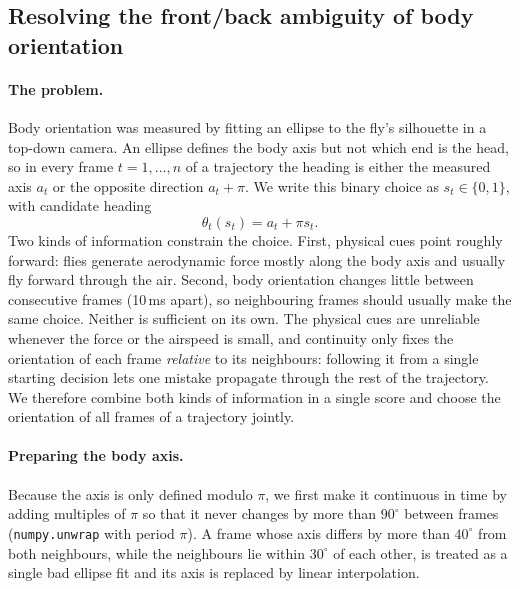 
\subsection*{Resolving the front/back ambiguity of body orientation}

\paragraph{The problem.}
Body orientation was measured by fitting an ellipse to the fly's silhouette in a top-down camera. An ellipse
defines the body axis but not which end is the head, so in every frame $t = 1,\dots,n$ of a trajectory the
heading is either the measured axis $a_t$ or the opposite direction $a_t + \pi$. We write this binary choice as
$s_t \in \{0, 1\}$, with candidate heading
\begin{equation}
  \theta_t(s_t) = a_t + \pi s_t .
\end{equation}
Two kinds of information constrain the choice. First, physical cues point roughly forward: flies generate
aerodynamic force mostly along the body axis and usually fly forward through the air. Second, body orientation
changes little between consecutive frames (10\,ms apart), so neighbouring frames should usually make the same
choice. Neither is sufficient on its own. The physical cues are unreliable whenever the force or the airspeed is
small, and continuity only fixes the orientation of each frame \emph{relative} to its neighbours: following it
from a single starting decision lets one mistake propagate through the rest of the trajectory. We therefore
combine both kinds of information in a single score and choose the orientation of all frames of a trajectory
jointly.

\paragraph{Preparing the body axis.}
Because the axis is only defined modulo $\pi$, we first make it continuous in time by adding multiples of $\pi$
so that it never changes by more than $90^\circ$ between frames (\texttt{numpy.unwrap} with period $\pi$). A frame
whose axis differs by more than $40^\circ$ from both neighbours, while the neighbours lie within $30^\circ$ of each
other, is treated as a single bad ellipse fit and its axis is replaced by linear interpolation.

